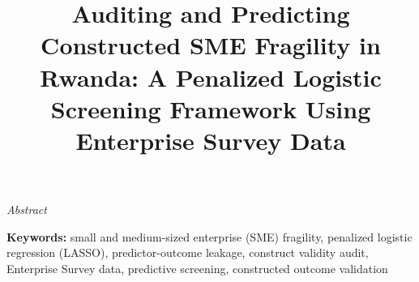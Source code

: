 \documentclass[man,12pt,floatsintext,donotrepeattitle]{apa7}
\title{Auditing and Predicting Constructed SME Fragility in Rwanda: A Penalized Logistic Screening Framework Using Enterprise Survey Data}
\begin{document}
\maketitle
\justifying
\pagestyle{plain}
\thispagestyle{empty}

\clearpage
{}
\thispagestyle{plain}
\begin{center}
\textit{Abstract}
\end{center}
\begin{itshape}
\justifying

\end{itshape}

\vspace{1em}
\noindent\textbf{Keywords:} small and medium-sized enterprise (SME) fragility, penalized logistic regression (LASSO), predictor-outcome leakage, construct validity audit, Enterprise Survey data, predictive screening, constructed outcome validation

\clearpage










\printbibliography
\end{document}
